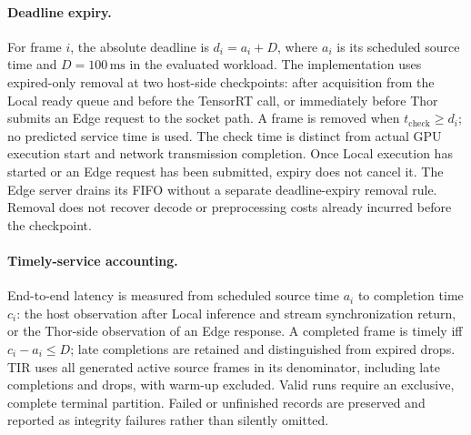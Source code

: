 \paragraph{Deadline expiry.}
For frame $i$, the absolute deadline is $d_i=a_i+D$, where $a_i$ is
its scheduled source time and $D=100\,\mathrm{ms}$ in the evaluated
workload. The implementation uses expired-only removal at two host-side
checkpoints: after acquisition from the Local ready queue and before the
TensorRT call, or immediately before Thor submits an Edge request to the
socket path. A frame is removed when $t_{\mathrm{check}}\ge d_i$;
no predicted service time is used. The check time is distinct from actual
GPU execution start and network transmission completion. Once Local
execution has started or an Edge request has been submitted, expiry does
not cancel it. The Edge server drains its FIFO without a separate
deadline-expiry removal rule. Removal does not recover decode or
preprocessing costs already incurred before the checkpoint.

\paragraph{Timely-service accounting.}
End-to-end latency is measured from scheduled source time $a_i$ to
completion time $c_i$: the host observation after Local inference and
stream synchronization return, or the Thor-side observation of an Edge
response. A completed frame is timely iff $c_i-a_i\le D$; late completions
are retained and distinguished from expired drops. TIR uses all generated
active source frames in its denominator, including late completions and
drops, with warm-up excluded. Valid runs require an exclusive, complete
terminal partition. Failed or unfinished records are preserved and
reported as integrity failures rather than silently omitted.
